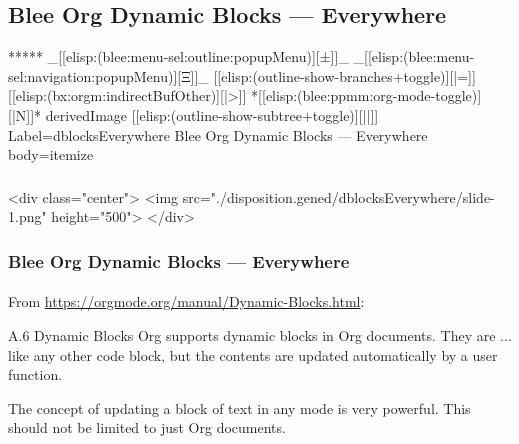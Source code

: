 \begin{whenOrg}
\section{Blee Org Dynamic Blocks --- Everywhere}


\begin{whenOrg}
*****  _[[elisp:(blee:menu-sel:outline:popupMenu)][±]]_ _[[elisp:(blee:menu-sel:navigation:popupMenu)][Ξ]]_ [[elisp:(outline-show-branches+toggle)][|=]] [[elisp:(bx:orgm:indirectBufOther)][|>]] *[[elisp:(blee:ppmm:org-mode-toggle)][|N]]*  derivedImage [[elisp:(outline-show-subtree+toggle)][||]] Label=dblocksEverywhere Blee Org Dynamic Blocks --- Everywhere body=itemize
\end{whenOrg}

\begin{htmlonly}

\begin{frame}[fragile,plain,label=dblocksEverywhere]
    \frametitle{}
    \framesubtitle{}
    \begin{rawhtml}
<div class="center">
<img src="./disposition.gened/dblocksEverywhere/slide-1.png" height="500">
</div>
    \end{rawhtml}
\end{frame}
\end{htmlonly}

\begin{verblatex}

\begin{frame}[fragile,plain,label=dblocksEverywhere]
    \frametitle{Blee Org Dynamic Blocks --- Everywhere}
    \framesubtitle{}


    From \url{https://orgmode.org/manual/Dynamic-Blocks.html}:

    \begin{exampleblock}{A.6 Dynamic Blocks}
      Org supports dynamic blocks in Org documents. They are ...  like any other code block, but the contents are updated automatically by a
      user function.
    \end{exampleblock}

    The concept of updating a block of text in any mode  is very powerful.
    This  should not be limited to just Org documents.


\end{frame}
\end{verblatex}
\end{whenOrg}
